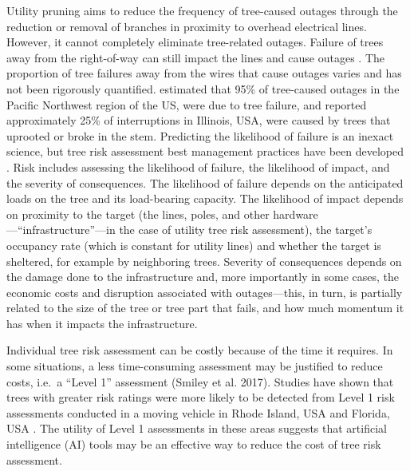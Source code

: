 \documentclass[11pt,twoside]{article}
\numberwithin{equation}{section}
\newcommand{\?}{\stackrel{?}{=}}
\begin{document}
Utility pruning aims to reduce the frequency of tree-caused outages through the reduction or removal of branches in proximity to overhead electrical lines.
However, it cannot completely eliminate tree-related outages. Failure of trees away from the right-of-way can still impact the lines and cause outages \cite{guggenmoos2003effects}. The proportion of tree failures away from the wires that cause outages varies and has not been rigorously quantified. \citet{guggenmoos2011treerelated} estimated that 95\% of tree-caused outages in the Pacific Northwest region of the US, were due to tree failure, and \citet{wismer2018targeted} reported approximately 25\% of interruptions in Illinois, USA, were caused by trees that uprooted or broke in the stem. Predicting the likelihood of failure is an inexact science, but tree risk assessment best management practices have been developed \cite{e.thomassmiley2017best,johnw.goodfellow2020best}. Risk includes assessing the likelihood of failure, the likelihood of impact, and the severity of consequences. The likelihood of failure depends on the anticipated loads on the tree and its load-bearing capacity. The likelihood of impact depends on proximity to the target (the lines, poles, and other hardware---``infrastructure''---in the case of utility tree risk assessment), the target’s occupancy rate (which is constant for utility lines) and whether the target is sheltered, for example by neighboring trees. Severity of consequences depends on the damage done to the infrastructure and, more importantly in some cases, the economic costs and disruption associated with outages---this, in turn, is partially related to the size of the tree or tree part that fails, and how much momentum it has when it impacts the infrastructure.

Individual tree risk assessment can be costly because of the time it requires. In some situations, a less time-consuming assessment may be justified to reduce costs, i.e.\ a ``Level 1'' assessment (Smiley et al. 2017). Studies have shown that trees with greater risk ratings were more likely to be detected from Level 1 risk assessments conducted in a moving vehicle in Rhode Island, USA \cite{rooney2005reliability} and Florida, USA \cite{koeser2016frequency} . The utility of Level 1 assessments in these areas suggests that artificial intelligence (AI) tools may be an effective way to reduce the cost of tree risk assessment.
\end{document}
